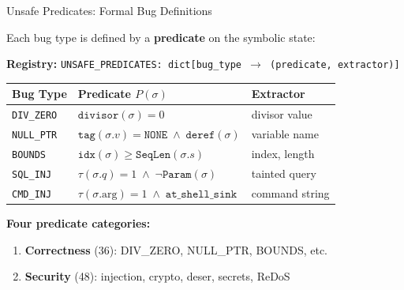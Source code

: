 \documentclass[aspectratio=169]{beamer}
\begin{document}
\begin{frame}[fragile]{Unsafe Predicates: Formal Bug Definitions}

Each bug type is defined by a \textbf{predicate} on the symbolic state:

\vspace{0.3em}
\textbf{Registry:} \texttt{UNSAFE\_PREDICATES: dict[bug\_type $\to$ (predicate, extractor)]}

\vspace{0.3em}
\begin{tabular}{lll}
\textbf{Bug Type} & \textbf{Predicate $P(\sigma)$} & \textbf{Extractor} \\
\hline
\texttt{DIV\_ZERO} & $\texttt{divisor}(\sigma) = 0$ & divisor value \\
\texttt{NULL\_PTR} & $\texttt{tag}(\sigma.v) = \texttt{NONE} \;\land\; \texttt{deref}(\sigma)$ & variable name \\
\texttt{BOUNDS} & $\texttt{idx}(\sigma) \geq \texttt{SeqLen}(\sigma.s)$ & index, length \\
\texttt{SQL\_INJ} & $\tau(\sigma.q) = 1 \;\land\; \lnot\texttt{Param}(\sigma)$ & tainted query \\
\texttt{CMD\_INJ} & $\tau(\sigma.\text{arg}) = 1 \;\land\; \texttt{at\_shell\_sink}$ & command string \\
\end{tabular}

\vspace{0.5em}
\textbf{Four predicate categories:}
\begin{enumerate}\setlength\itemsep{0pt}
  \item \textbf{Correctness} (36): DIV\_ZERO, NULL\_PTR, BOUNDS, etc.
  \item \textbf{Security} (48): injection, crypto, deser, secrets, ReDoS
\end{enumerate}

\end{frame}
\end{document}
